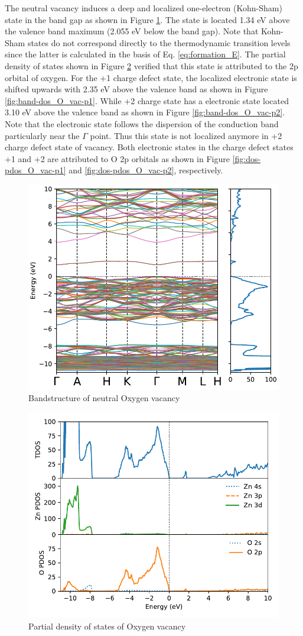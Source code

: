 The neutral  vacancy induces a deep and localized one-electron (Kohn-Sham) state in the band gap as shown in Figure \ref{fig:band-dos_O_vac}. The state is located 1.34 eV above the valence band maximum (2.055 eV below the band gap). Note that Kohn-Sham states do not correspond directly to the thermodynamic transition levels since the latter is calculated in the basis of Eq. \eqref{eq:formation_E}. The partial density of states shown in Figure \ref{fig:dos-pdos_O_vac} verified that this state is attributed to the 2p orbital of oxygen. For the +1 charge defect state, the localized electronic state is shifted upwards with 2.35 eV above the valence band as shown in Figure  \ref{fig:band-dos_O_vac-p1}.  While +2 charge state has a electronic state located 3.10 eV above the valence band as shown in Figure \ref{fig:band-dos_O_vac-p2}. Note that the electronic state follows the dispersion of the conduction band particularly near the $\Gamma$ point. Thus this state is not localized anymore in +2 charge defect state of  vacancy. Both electronic states in the charge defect states +1 and +2 are attributed to O 2p orbitals as shown in Figure \ref{fig:dos-pdos_O_vac-p1} and \ref{fig:dos-pdos_O_vac-p2}, respectively.


\begin{figure}[tbh!]
	\centering
	\includegraphics[width=0.6\linewidth]{"images/rnd/band-dos_O_vac"}
	\caption[Bandstructure of neutral Oxygen vacancy]{Bandstructure of neutral Oxygen vacancy}
	\label{fig:band-dos_O_vac}
\end{figure}

\begin{figure}[tbh!]
	\centering
	\includegraphics[width=0.6\linewidth]{"images/rnd/dos-pdos_O_vac"}
	\caption[Partial density of states of Oxygen vacancy]{Partial density of states of Oxygen vacancy}
	\label{fig:dos-pdos_O_vac}
\end{figure}


